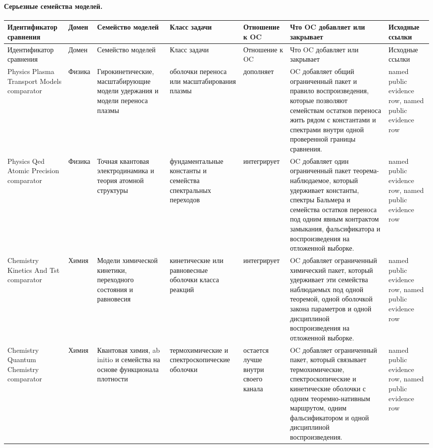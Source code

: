 \paragraph{Серьезные семейства моделей.}
\begingroup
\scriptsize
\setlength{\emergencystretch}{1.5em}
\setlength{\tabcolsep}{2pt}
\setlength{\LTleft}{0pt}
\setlength{\LTright}{0pt}
\begin{longtable}{@{}L{0.14\textwidth}L{0.09\textwidth}L{0.14\textwidth}L{0.12\textwidth}L{0.10\textwidth}L{0.18\textwidth}L{0.15\textwidth}@{}}
\toprule
Идентификатор сравнения & Домен & Семейство моделей & Класс задачи & Отношение к OC & Что OC добавляет или закрывает & Исходные ссылки \\
\midrule
\endfirsthead
\toprule
Идентификатор сравнения & Домен & Семейство моделей & Класс задачи & Отношение к OC & Что OC добавляет или закрывает & Исходные ссылки \\
\midrule
\endhead
Physics Plasma Transport Models comparator & Физика & Гирокинетические, масштабирующие модели удержания и модели переноса плазмы & оболочки переноса или масштабирования плазмы & дополняет & OC добавляет общий ограниченный пакет и правило воспроизведения, которые позволяют семействам остатков переноса жить рядом с константами и спектрами внутри одной проверенной границы сравнения. & named public evidence row, named public evidence row \\
Physics Qed Atomic Precision comparator & Физика & Точная квантовая электродинамика и теория атомной структуры & фундаментальные константы и семейства спектральных переходов & интегрирует & OC добавляет один ограниченный пакет теорема-наблюдаемое, который удерживает константы, спектры Бальмера и семейства остатков переноса под одним явным контрактом замыкания, фальсификатора и воспроизведения на отложенной выборке. & named public evidence row, named public evidence row \\
Chemistry Kinetics And Tst comparator & Химия & Модели химической кинетики, переходного состояния и равновесия & кинетические или равновесные оболочки класса реакций & интегрирует & OC добавляет ограниченный химический пакет, который удерживает эти семейства наблюдаемых под одной теоремой, одной оболочкой закона параметров и одной дисциплиной воспроизведения на отложенной выборке. & named public evidence row, named public evidence row \\
Chemistry Quantum Chemistry comparator & Химия & Квантовая химия, ab initio и семейства на основе функционала плотности & термохимические и спектроскопические оболочки & остается лучше внутри своего канала & OC добавляет ограниченный пакет, который связывает термохимические, спектроскопические и кинетические оболочки с одним теоремно-нативным маршрутом, одним фальсификатором и одной дисциплиной воспроизведения. & named public evidence row, named public evidence row \\

\end{longtable}
